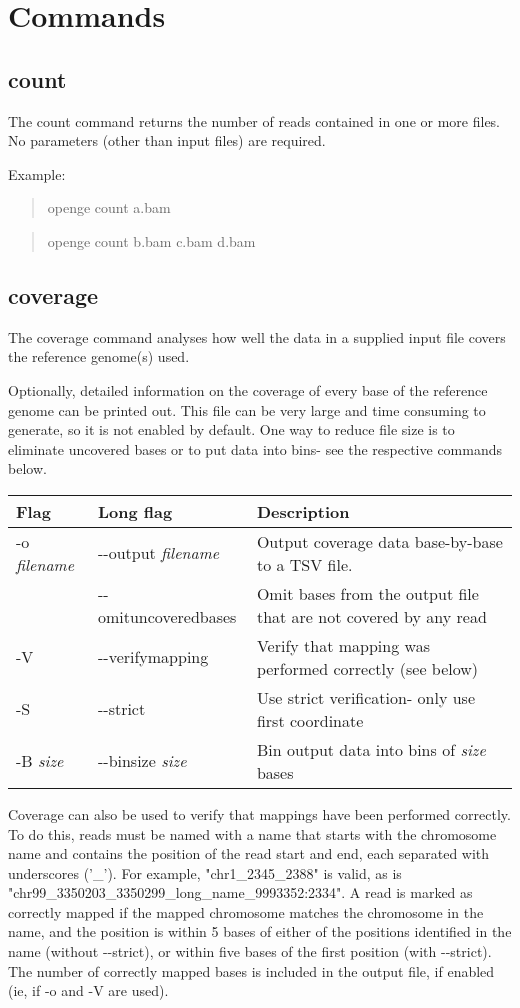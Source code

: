 \documentclass[11pt]{article}
\newcommand {\cmd}[1] {\begin{quote}#1\end{quote}}
\begin{document}
\section {Commands}

\subsection {count}
The count command returns the number of reads contained in one or more files. No parameters (other than input files) are required.

Example:
\cmd{openge count a.bam}
\cmd{openge count b.bam c.bam d.bam}

\subsection {coverage}
The coverage command analyses how well the data in a supplied input file covers the reference genome(s) used.

Optionally, detailed information on the coverage of every base of the reference genome can be printed out. This file can be very large and time consuming to generate, so it is not enabled by default. One way to reduce file size is to eliminate uncovered bases or to put data into bins- see the respective commands below.

\begin{center}
\begin{tabular}{llp{3.5in}}
\hline
Flag&Long flag&Description\\ \hline
-o  \textit{filename}&{-}{-}output \textit{filename}&Output coverage data base-by-base to a TSV file.\\
&{-}{-}omituncoveredbases&Omit bases from the output file that are not covered by any read\\
-V&{-}{-}verifymapping&Verify that mapping was performed correctly (see below)\\
-S&{-}{-}strict&Use strict verification- only use first coordinate\\
-B \textit{size}&{-}{-}binsize \textit{size}&Bin output data into bins of \textit{size} bases\\
\end{tabular}
\end{center}

Coverage can also be used to verify that mappings have been performed correctly. To do this, reads must be named with a name that starts with the chromosome name and contains the position of the read start and end, each separated with underscores ('\_'). For example, "chr1\_2345\_2388" is valid, as is "chr99\_3350203\_3350299\_long\_name\_9993352:2334". A read is marked as correctly mapped if the mapped chromosome matches the chromosome in the name, and the position is within 5 bases of either of the positions identified in the name (without {-}{-}strict), or within five bases of the first position (with {-}{-}strict). The number of correctly mapped bases is included in the output file, if enabled (ie, if -o and -V are used).
\end{document}
